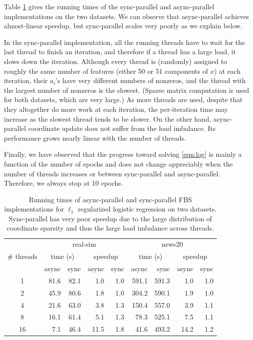Table \ref{tab:log_time} gives the running times of  the sync-parallel and async-parallel implementations on the two datasets. We can observe that async-parallel achieves almost-linear speedup, but sync-parallel scales very poorly as we explain below.

In the sync-parallel implementation,  all the running threads have to wait for the last thread to finish an iteration, and therefore if a thread has a large load, it slows down the iteration. Although every thread is (randomly) assigned to roughly the same number of features (either 50 or 51 components of $x$) at each iteration, their  $a_i$'s have very different numbers of nonzeros, and the thread with the largest number of nonzeros is the slowest. (Sparse matrix computation is used for both datasets, which are very large.) As more threads are used,  despite that they altogether do more work at each iteration,  the per-iteration time may increase as the slowest thread tends to be slower. On the other hand, async-parallel coordinate update does not suffer from the  load imbalance. Its performance grows nearly linear with the number of threads.

Finally, we have observed that the progress toward solving \eqref{eqn:log} is mainly a function of the number of epochs and does not change appreciably  when the number of threads increases or between sync-parallel and async-parallel. Therefore, we always stop at 10 epochs.


\begin{table}[htbp]
\centering
 \begin{tabular}{|c|r|r|r|r|r|r|r|r|}
  \hline
  \multirow{3}{*}{\# threads} & \multicolumn{4}{|c|}{real-sim} & \multicolumn{4}{c|}{news20} \\
  \cline{2-9}
  & \multicolumn{2}{|c|}{time (s)} &  \multicolumn{2}{c|}{speedup} &  \multicolumn{2}{c|}{time (s)} & \multicolumn{2}{c|}{speedup}\\
  \cline{2-9}
  & async & sync &  async & sync &  async & sync &  async & sync \\
  \hline
   1 &   81.6 &  82.1 & 1.0   & 1.0 & 591.1   & 591.3 & 1.0   & 1.0\\
   2 &   45.9   &  80.6 & 1.8   & 1.0 & 304.2   & 590.1 & 1.9   & 1.0\\
   4 &   21.6   &  63.0   & 3.8   & 1.3 & 150.4   & 557.0 & 3.9   & 1.1\\
   8 &   16.1   &  61.4   & 5.1   & 1.3 & 78.3     & 525.1 & 7.5   & 1.1\\
   16 & 7.1     &  46.4   & 11.5 & 1.8 & 41.6     & 493.2 & 14.2 & 1.2\\
  \hline
 \end{tabular}
 \caption{\label{tab:log_time}Running times of async-parallel and sync-parallel FBS implementations for $\ell_1$ regularized logistic regression on two datasets. Sync-parallel has very poor speedup  due to the large distribution of coordinate sparsity and thus the large load imbalance across threads.}
\end{table}
